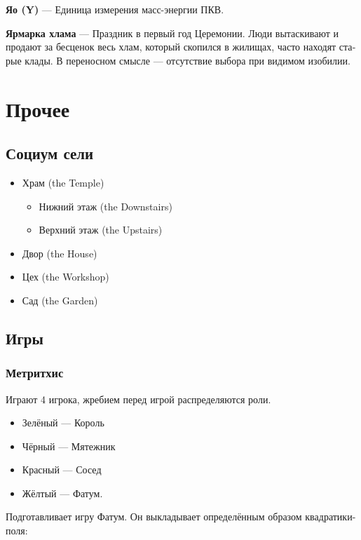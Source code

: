 \documentclass[a4paper,12pt,fleqn]{book}\usepackage{polyglossia}\setdefaultlanguage[babelshorthands=true]{russian}\setotherlanguage{english}\defaultfontfeatures{Ligatures=TeX,Mapping=tex-text}\usepackage{xcolor}\newcommand{\ml}[3]{#2}
\newcommand{\theterm}[3]{\textbf{\hypertarget{#1}{#2}} --- #3}
\begin{document}
{\theterm{yao}
{Яо (Y)}
{Единица измерения масс-энергии ПКВ.}

\theterm{rubbish-fair}
{Ярмарка хлама}
{Праздник в первый год Церемонии.
Люди вытаскивают и продают за бесценок весь хлам, который скопился в жилищах, часто находят старые клады.
В переносном смысле --- отсутствие выбора при видимом изобилии.}

\chapter{Прочее}

\section{Социум сели}

\begin{itemize}
\item Храм (the Temple)
\begin{itemize}
\item Нижний этаж (the Downstairs)
\item Верхний этаж (the Upstairs)
\end{itemize}
\item Двор (the House)
\item Цех (the Workshop)
\item Сад (the Garden)
\end{itemize}


\section{Игры}

\subsection{Метритхис}

Играют 4 игрока, жребием перед игрой распределяются роли.

\begin{itemize}
\item Зелёный --- Король
\item Чёрный --- Мятежник
\item Красный --- Сосед
\item Жёлтый --- Фатум.
\end{itemize}

Подготавливает игру Фатум.
Он выкладывает определённым образом квадратики-поля:

}
\end{document}
